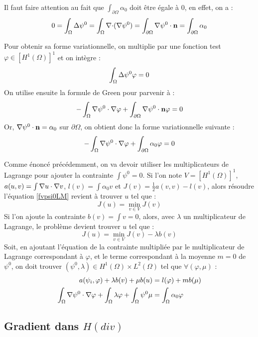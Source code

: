 Il faut faire attention au fait que $\int_{\partial\Omega} \alpha_0$ doit être égale à 0, en effet, on a :
\[ 0=\int_\Omega {\Delta} \psi^0 = \int_\Omega {\nabla\cdot}({\nabla}\psi^0) = \int_{\partial\Omega} {\nabla}\psi^0\cdot \mathbf{n} = \int_{\partial\Omega} \alpha_0 \]

Pour obtenir sa forme variationnelle, on multiplie par une fonction test $\varphi\in [H^1(\Omega)]^1$ et on intègre :
\[ \int_\Omega {\Delta}\psi^0 \varphi = 0 \]
On utilise ensuite la formule de Green pour parvenir à :
\[ -\int_\Omega {\nabla}\psi^0\cdot{\nabla}\varphi + \int_{\partial\Omega} {\nabla}\psi^0\cdot \mathbf{n}\varphi = 0 \]
Or, ${\nabla}\psi^0\cdot \mathbf{n} = \alpha_0$ sur $\partial\Omega$, on obtient donc la forme variationnelle suivante :
\begin{equation}\label{fvpsi0LM} -\int_\Omega {\nabla}\psi^0\cdot{\nabla}\varphi + \int_{\partial\Omega} \alpha_0\varphi = 0
\end{equation}

Comme énoncé précédemment, on va devoir utiliser les multiplicateurs de Lagrange pour ajouter la contrainte $\int \psi^0=0$.
Si l'on note $V=[H^1(\Omega)]^1$, $a(u,v)=\int {\nabla} u \cdot {\nabla} v$, $l(v)=\int \alpha_0v$ et $J(v)=\frac{1}{2}a(v,v)-l(v)$, alors résoudre l'équation \ref{fvpsi0LM} revient à trouver $u$ tel que :
\[ J(u) = \min_{v\in V} J(v) \]
Si l'on ajoute la contrainte $b(v) = \int v = 0$, alors, avec $\lambda$ un multiplicateur de Lagrange, le problème devient trouver $u$ tel que :
\[ J(u) = \min_{v\in V} J(v) - \lambda b(v) \]
Soit, en ajoutant l'équation de la contrainte multipliée par le multiplicateur de Lagrange correspondant à $\varphi$, et le terme correspondant à la moyenne $m=0$ de $\psi^0$, on doit trouver $(\psi^0,\lambda)\in H^1(\Omega)\times L^2(\Omega)$ tel que $\forall (\varphi,\mu)$ :
\begin{align}\label{fvpsi0}
a(\psi_i,\varphi) + \lambda b(v) + \mu b(u) &= l(\varphi) + m b(\mu) \notag \\
\int_\Omega {\nabla}\psi^0\cdot{\nabla}\varphi + \int_\Omega \lambda\varphi + \int_\Omega \psi^0\mu &= \int_\Omega \alpha_0\varphi
\end{align}

\subsection{Gradient dans $H(div)$}

